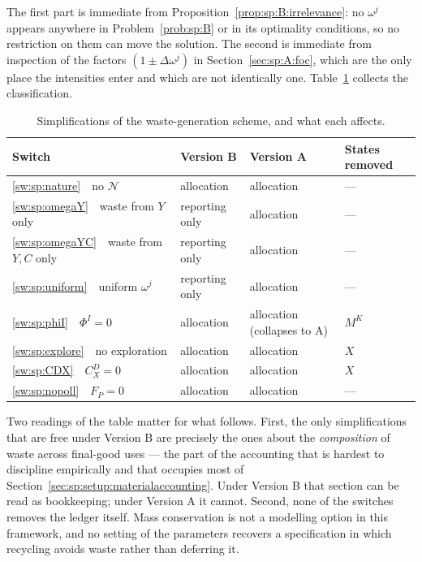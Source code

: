 The first part is immediate from Proposition~\ref{prop:sp:B:irrelevance}: no $\omega^j$ appears anywhere
in Problem~\ref{prob:sp:B} or in its optimality conditions, so no restriction on them can move the
solution. The second is immediate from inspection of the factors $\left(1\pm\Delta\omega^j\right)$ in
Section~\ref{sec:sp:A:foc}, which are the only place the intensities enter and which are not identically
one. Table~\ref{tab:sp:switches} collects the classification.

\begin{table}[H]
\centering
\caption{Simplifications of the waste-generation scheme, and what each affects.}
\label{tab:sp:switches}
\setlength{\tabcolsep}{5pt}
\renewcommand{\arraystretch}{1.05}
\begin{tabular}{@{}p{}p{}p{}p{}@{}}
\toprule
Switch & Version B & Version A & States removed \\
\midrule
\ref{sw:sp:nature}\ \ no $\mathcal N$          & allocation & allocation & --- \\
\ref{sw:sp:omegaY}\ \ waste from $Y$ only      & reporting only & allocation & --- \\
\ref{sw:sp:omegaYC}\ \ waste from $Y,C$ only   & reporting only & allocation & --- \\
\ref{sw:sp:uniform}\ \ uniform $\omega^j$      & reporting only & allocation & --- \\
\ref{sw:sp:phiI}\ \ $\Phi^I=0$                 & allocation & allocation (collapses to A) & $M^K$ \\
\ref{sw:sp:explore}\ \ no exploration          & allocation & allocation & $X$ \\
\ref{sw:sp:CDX}\ \ $C^D_X=0$                   & allocation & allocation & $X$ \\
\ref{sw:sp:nopoll}\ \ $F_P=0$                  & allocation & allocation & --- \\
\bottomrule
\end{tabular}
\end{table}

Two readings of the table matter for what follows. First, the only simplifications that are free under
Version B are precisely the ones about the \emph{composition} of waste across final-good uses --- the
part of the accounting that is hardest to discipline empirically and that occupies most of
Section~\ref{sec:sp:setup:materialaccounting}. Under Version B that section can be read as bookkeeping;
under Version A it cannot. Second, none of the switches removes the ledger itself. Mass conservation is
not a modelling option in this framework, and no setting of the parameters recovers a specification in
which recycling avoids waste rather than deferring it.


